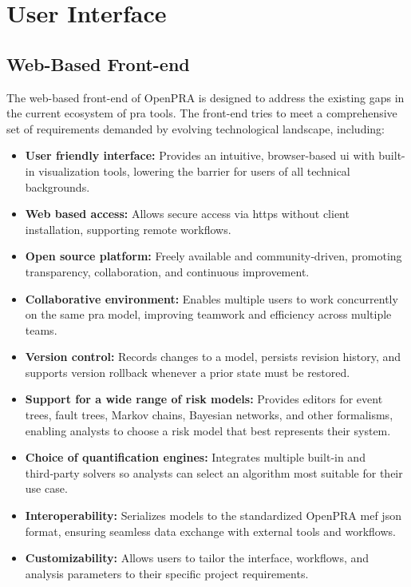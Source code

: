 \section{User Interface}

\subsection{Web-Based Front-end}

The web-based front-end of OpenPRA is designed to address the existing gaps in the current ecosystem of \acrshort{pra} tools. The front-end tries to meet a comprehensive set of requirements demanded by evolving technological landscape, including:

\begin{itemize}
\item \textbf{User friendly interface:} Provides an intuitive, browser-based \acrshort{ui} with built-in visualization tools, lowering the barrier for users of all technical backgrounds.
\item \textbf{Web based access:} Allows secure access via \acrshort{https} without client installation, supporting remote workflows.
\item \textbf{Open source platform:} Freely available and community‑driven, promoting transparency, collaboration, and continuous improvement.
\item \textbf{Collaborative environment:} Enables multiple users to work concurrently on the same \acrshort{pra} model, improving teamwork and efficiency across multiple teams.
\item \textbf{Version control:} Records changes to a model, persists revision history, and supports version rollback whenever a prior state must be restored.  
\item \textbf{Support for a wide range of risk models:} Provides editors for event trees, fault trees, Markov chains, Bayesian networks, and other formalisms, enabling analysts to choose a risk model that best represents their system.  
\item \textbf{Choice of quantification engines:} Integrates multiple built‑in and third‑party solvers so analysts can select an algorithm most suitable for their use case.  
\item \textbf{Interoperability:} Serializes models to the standardized OpenPRA \acrshort{mef} \acrshort{json} format, ensuring seamless data exchange with external tools and workflows.
\item \textbf{Customizability:} Allows users to tailor the interface, workflows, and analysis parameters to their specific project requirements.
\end{itemize}

